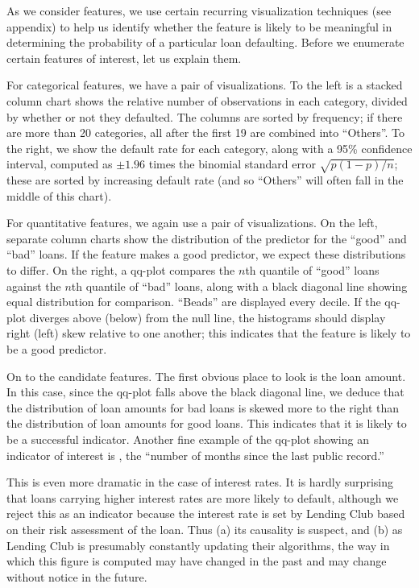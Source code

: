 As we consider features, we use certain recurring visualization techniques (see appendix) to help us identify whether the feature is likely to be meaningful in determining the probability of a particular loan defaulting. Before we enumerate certain features of interest, let us explain them.

For categorical features, we have a pair of visualizations. To the left is a stacked column chart shows the relative number of observations in each category, divided by whether or not they defaulted. The columns are sorted by frequency; if there are more than 20 categories, all after the first 19 are combined into ``Others''. To the right, we show the default rate for each category, along with a 95\% confidence interval, computed as $\pm 1.96$ times the binomial standard error $\sqrt{p(1-p)/n}$; these are sorted by increasing default rate (and so ``Others'' will often fall in the middle of this chart).

For quantitative features, we again use a pair of visualizations. On the left, separate column charts show the distribution of the predictor for the ``good'' and ``bad'' loans. If the feature makes a good predictor, we expect these distributions to differ. On the right, a qq-plot compares the $n$th quantile of ``good'' loans against the $n$th quantile of ``bad'' loans, along with a black diagonal line showing equal distribution for comparison. ``Beads'' are displayed every decile. If the qq-plot diverges above (below) from the null line, the histograms should display right (left) skew relative to one another; this indicates that the feature is likely to be a good predictor.

On to the candidate features. The first obvious place to look is the loan amount. In this case, since the qq-plot falls above the black diagonal line, we deduce that the distribution of loan amounts for bad loans is skewed more to the right than the distribution of loan amounts for good loans. This indicates that it is likely to be a successful indicator. Another fine example of the qq-plot showing an indicator of interest is , the ``number of months since the last public record.''

This is even more dramatic in the case of interest rates. It is hardly surprising that loans carrying higher interest rates are more likely to default, although we reject this as an indicator because the interest rate is set by Lending Club based on their risk assessment of the loan. Thus (a) its causality is suspect, and (b) as Lending Club is presumably constantly updating their algorithms, the way in which this figure is computed may have changed in the past and may change without notice in the future.

